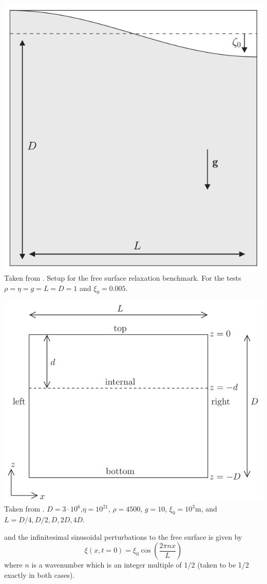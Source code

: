 \begin{center}
\begin{minipage}{0.45\textwidth}
\centering
\includegraphics[height=0.8\textwidth]{images/benchmark_relaxation/robh17}\\
{\captionfont Taken from \cite{robh17}. Setup for the free surface relaxation benchmark.
For the tests $\rho=\eta=g=L=D=1$ and $\xi_0=0.005$.}
\end{minipage}\hfill
\begin{minipage}{0.45\textwidth}
\centering
\includegraphics[height=0.8\textwidth]{images/benchmark_relaxation/krwd12}\\
{\captionfont Taken from \cite{krwd12}. $D=3\cdot 10^6$,$\eta=10^{21}$, $\rho=4500$, $g=10$, $\xi_0=10^3$m, and 
$L=D/4,D/2,D,2D,4D$.}
\end{minipage}
\end{center}
and the infinitesimal sinusoidal perturbations to the free surface is given by
\[
\xi(x,t=0)=\xi_0 \cos \left( \frac{2 \pi n x}{L}  \right)
\]
where $n$ is a wavenumber which is an integer multiple of 1/2 (taken to be 1/2 exactly in both cases).


